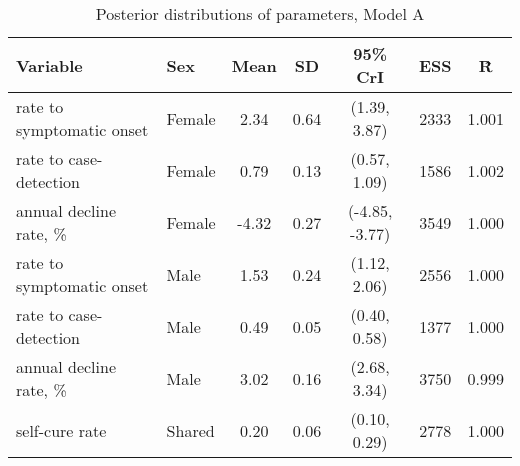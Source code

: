 \begin{table}[h]

\caption{\label{tab:}Posterior distributions of parameters, Model A}
\centering
\begin{tabular}[t]{llccccc}
\toprule
Variable & Sex & Mean & SD & 95\% CrI & ESS & \^{R}\\
\midrule
rate to symptomatic onset & Female & 2.34 & 0.64 & (1.39, 3.87) & 2333 & 1.001\\
rate to case-detection & Female & 0.79 & 0.13 & (0.57, 1.09) & 1586 & 1.002\\
annual decline rate, \% & Female & -4.32 & 0.27 & (-4.85, -3.77) & 3549 & 1.000\\
\addlinespace
rate to symptomatic onset & Male & 1.53 & 0.24 & (1.12, 2.06) & 2556 & 1.000\\
rate to case-detection & Male & 0.49 & 0.05 & (0.40, 0.58) & 1377 & 1.000\\
annual decline rate, \% & Male & 3.02 & 0.16 & (2.68, 3.34) & 3750 & 0.999\\
\addlinespace
self-cure rate & Shared & 0.20 & 0.06 & (0.10, 0.29) & 2778 & 1.000\\
\bottomrule
\end{tabular}
\end{table}

